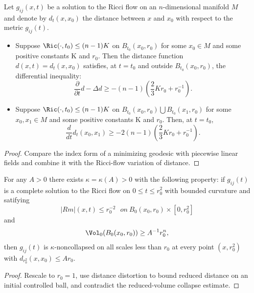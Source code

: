\begin{lemma}
  \label{lem:cz-distance-distortion-under-ricci-flow}
Let $g_{ij}(x,t)$ be a solution to the Ricci flow on an
$n$-dimensional manifold $M$ and denote by $d_t(x,x_0)$ the
distance between $x$ and $x_0$ with respect to the metric
$g_{ij}(t)$.
\begin{itemize}
\item[(i)] Suppose $\Ric(\cdot,t_0)\leq(n-1)K$ on
$B_{t_0}(x_0,r_0)$ for some $x_0\in M$ and some positive constants
K and $r_0$. Then the distance function $d(x,t)=d_t(x,x_0)$
satisfies, at $t=t_0$ and outside $B_{t_0}(x_0,r_0)$, the
differential inequality:
$$
\frac{\partial}{\partial t}d-\Delta d
\geq-(n-1)\left(\frac{2}{3}Kr_0+r_0^{-1}\right).
$$
\item[(ii)] Suppose $\Ric(\cdot,t_0)\leq (n-1)K$ on
$B_{t_0}(x_0,r_0)\bigcup B_{t_0}(x_1,r_0)$ for some $x_0,x_1\in M$
and some positive constants K and $r_0$.  Then, at $t=t_0$,
$$
\frac{d}{dt}d_t(x_0,x_1)\geq-2(n-1)\left(\frac{2}{3}Kr_0+r_0^{-1}\right).
$$
\end{itemize}
\end{lemma}

\begin{proof}
  \sketch Compare the index form of a minimizing geodesic with piecewise linear fields and combine it with the Ricci-flow variation of distance.
\end{proof}

\begin{theorem}
  \label{thm:cz-no-local-collapsing-for-complete-flows}
For any $A >0$ there exists $\kappa=\kappa(A)>0$ with the
following property: if $g_{ij}(t)$ is a complete solution to the
Ricci flow on $0\leq t\leq r_0^2$ with bounded curvature and
satifying
$$
|Rm|(x,t)\leq r_0^{-2}\ \ \ on \ B_0(x_0,r_0)\times [0,r_0^2]
$$
and
$$
\Vol_0(B_0(x_0,r_0))\geq A^{-1}r_0^n,
$$
then $g_{ij}(t)$ is $\kappa$-noncollapsed on all scales less than
$r_0$ at every point $(x,r_0^2)$ with $d_{r_0^2}(x,x_0)\leq Ar_0$.
\end{theorem}

\begin{proof}
  \sketch Rescale to $r_0=1$, use distance distortion to bound reduced distance on an initial controlled ball, and contradict the reduced-volume collapse estimate.
\end{proof}

